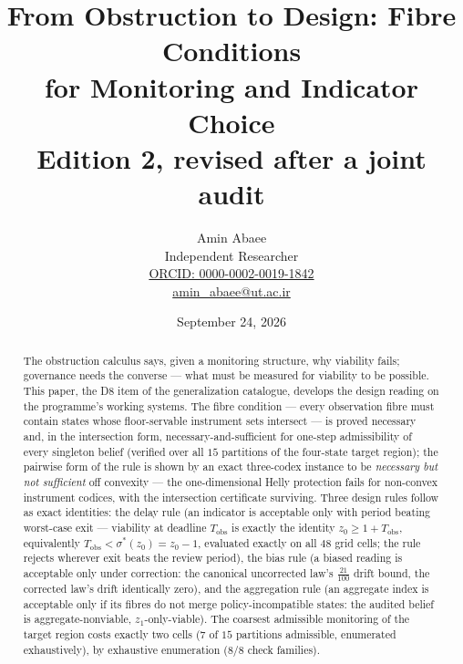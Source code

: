 \documentclass[10pt,twocolumn]{article}
\theoremstyle{definition}
\begin{document}
\title{From Obstruction to Design: Fibre Conditions\\ for Monitoring and Indicator Choice\\[0.2em]
{\large\rmfamily Edition 2, revised after a joint audit}}
\author{Amin Abaee\\[0.35em]
{\small Independent Researcher}\\[0.55em]
{\small\href{https://orcid.org/0000-0002-0019-1842}{ORCID: 0000-0002-0019-1842}}\\[0.3em]
{\small\href{mailto:amin\_abaee@ut.ac.ir}{amin\_abaee@ut.ac.ir}}}
\date{September 24, 2026}
\maketitle

\begin{abstract}
The obstruction calculus says, given a monitoring structure, why viability
fails; governance needs the converse --- what must be measured for viability
to be possible. This paper, the D8 item of the generalization catalogue,
develops the design reading on the programme's working systems. The fibre
condition --- every observation fibre must contain states whose
floor-servable instrument sets intersect --- is proved necessary and, in the
intersection form, necessary-and-sufficient for one-step admissibility of
every singleton belief (verified over all $15$ partitions of the four-state
target region); the pairwise form of the rule is shown by an exact
three-codex instance to be \emph{necessary but not sufficient} off
convexity --- the one-dimensional Helly protection fails for non-convex
instrument codices, with the intersection certificate surviving. Three
design rules follow as exact identities: the delay rule (an indicator is
acceptable only with period beating worst-case exit --- viability at
deadline $T_{\mathrm{obs}}$ is exactly the identity
$z_0\ge1+T_{\mathrm{obs}}$, equivalently
$T_{\mathrm{obs}}<\sigma^\ast(z_0)=z_0-1$, evaluated exactly on all $48$
grid cells; the rule rejects wherever exit beats the review period), the
bias rule (a biased reading is acceptable only under correction: the
canonical uncorrected law's $\tfrac{21}{100}$ drift bound, the corrected
law's drift identically zero), and the aggregation rule (an aggregate index
is acceptable only if its fibres do not merge policy-incompatible states:
the audited belief is aggregate-nonviable, $z_1$-only-viable). The coarsest
admissible monitoring of the target region costs exactly two cells
($7$ of $15$ partitions admissible, enumerated exhaustively), by
exhaustive enumeration (8/8 check families).
\end{abstract}
\end{document}
